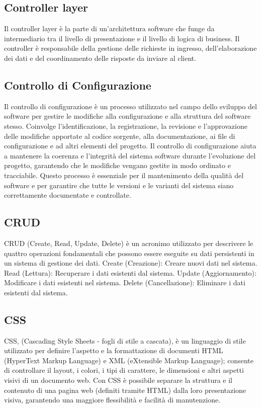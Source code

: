 \subsection*{Controller layer} 
Il controller layer è la parte di un'architettura software che funge da intermediario tra il livello di presentazione e il livello di logica di business. Il controller è responsabile della gestione delle richieste in ingresso, dell'elaborazione dei dati e del coordinamento delle risposte da inviare al client.
\subsection*{Controllo di Configurazione} 
Il controllo di configurazione è un processo utilizzato nel campo dello sviluppo del software per gestire le modifiche alla configurazione e alla struttura del software stesso. Coinvolge l'identificazione, la registrazione, la revisione e l'approvazione delle modifiche apportate al codice sorgente, alla documentazione, ai file di configurazione e ad altri elementi del progetto. Il controllo di configurazione aiuta a mantenere la coerenza e l'integrità del sistema software durante l'evoluzione del progetto, garantendo che le modifiche vengano gestite in modo ordinato e tracciabile. Questo processo è essenziale per il mantenimento della qualità del software e per garantire che tutte le versioni e le varianti del sistema siano correttamente documentate e controllate.
\subsection*{CRUD} 
CRUD (Create, Read, Update, Delete) è un acronimo utilizzato per descrivere le quattro operazioni fondamentali che possono essere eseguite su dati persistenti in un sistema di gestione dei dati. Create (Creazione): Creare nuovi dati nel sistema. Read (Lettura): Recuperare i dati esistenti dal sistema. Update (Aggiornamento): Modificare i dati esistenti nel sistema. Delete (Cancellazione): Eliminare i dati esistenti dal sistema.
\subsection*{CSS} 
CSS, (Cascading Style Sheets - fogli di stile a cascata), è un linguaggio di stile utilizzato per definire l'aspetto e la formattazione di documenti HTML (HyperText Markup Language) e XML (eXtensible Markup Language); consente di controllare il layout, i colori, i tipi di carattere, le dimensioni e altri aspetti visivi di un documento web. Con CSS è possibile separare la struttura e il contenuto di una pagina web (definiti tramite HTML) dalla loro presentazione visiva, garantendo una maggiore flessibilità e facilità di manutenzione.
